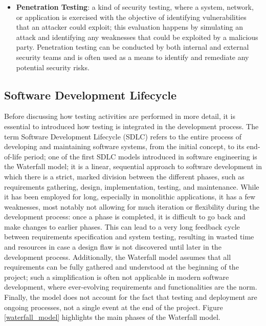 \begin{itemize}
    \item \textbf{Penetration Testing}: a kind of security testing, where a system, network, or application is exercised with the objective of identifying vulnerabilities that an attacker could exploit; this evaluation happens by simulating an attack and identifying any weaknesses that could be exploited by a malicious party. Penetration testing can be conducted by both internal and external security teams and is often used as a means to identify and remediate any potential security risks.
\end{itemize}



\subsection{Software Development Lifecycle}
Before discussing how testing activities are performed in more detail, it is essential to introduced how testing is integrated in the development process. The term Software Development Lifecycle (SDLC) refers to the entire process of developing and maintaining software systems, from the initial concept, to its end-of-life period; one of the first SDLC models introduced in software engineering is the Waterfall model; it is a linear, sequential approach to software development in which there is a strict, marked division between the different phases, such as requirements gathering, design, implementation, testing, and maintenance. While it has been employed for long, especially in monolithic applications, it has a few weaknesses, most notably not allowing for much iteration or flexibility during the development process: once a phase is completed, it is difficult to go back and make changes to earlier phases. This can lead to a very long feedback cycle between requirements specification and system testing, resulting in wasted time and resources in case a design flaw is not discovered until later in the development process. Additionally, the Waterfall model assumes that all requirements can be fully gathered and understood at the beginning of the project; such a simplification is often not applicable in modern software development, where ever-evolving requirements and functionalities are the norm. 
Finally, the model does not account for the fact that testing and deployment are ongoing processes, not a single event at the end of the project.
Figure \ref{waterfall_model} highlights the main phases of the Waterfall model.

